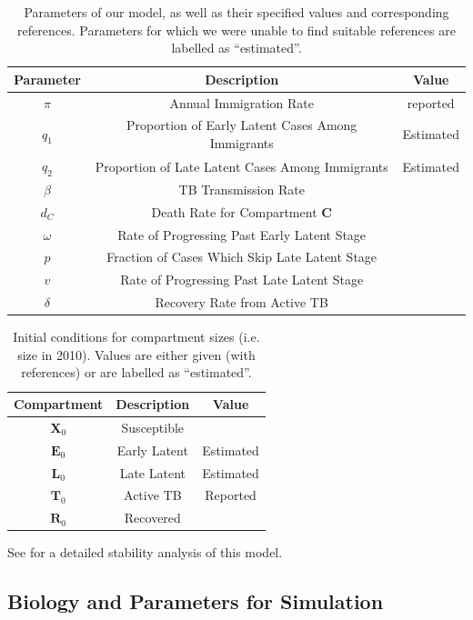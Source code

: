 \documentclass[sn-mathphys,Numbered]{sn-jnl}%
\newcommand{\cX}{\mathbf{X}}
\newcommand{\cE}{\mathbf{E}}
\newcommand{\cL}{\mathbf{L}}
\newcommand{\cT}{\mathbf{T}}
\newcommand{\cR}{\mathbf{R}}
\theoremstyle{thmstyleone}%
\theoremstyle{thmstyletwo}%
\theoremstyle{thmstylethree}%
\begin{document}
\begin{table}
    \centering
    \begin{tabular}{ccc}
        Parameter & Description & Value \\
        \hline
        $\pi$ & Annual Immigration Rate & reported \cite{https://www150.statcan.gc.ca/n1/pub/11-630-x/11-630-x2016006-eng.htm}\\
        $q_1$ & Proportion of Early Latent Cases Among Immigrants & Estimated \\
        $q_2$ & Proportion of Late Latent Cases Among Immigrants & Estimated \\
        $\beta$ & TB Transmission Rate & \\
        $d_C$ & Death Rate for Compartment $\mathbf{C}$ & \\
        $\omega$ & Rate of Progressing Past Early Latent Stage & \\
        $p$ & Fraction of Cases Which Skip Late Latent Stage &\\
        $v$ & Rate of Progressing Past Late Latent Stage &\\
        $\delta$ & Recovery Rate from Active TB&
    \end{tabular}
    \caption{Parameters of our model, as well as their specified values and corresponding references. Parameters for which we were unable to find suitable references are labelled as ``estimated''.}
    \label{tab:pars}
\end{table}

\begin{table}
    \centering
    \begin{tabular}{ccc}
    Compartment & Description & Value\\
    \hline
    $\cX_0$ & Susceptible & \\
    $\cE_0$ & Early Latent & Estimated\\
    $\cL_0$ & Late Latent & Estimated\\
    $\cT_0$ & Active TB & Reported \\
    $\cR_0$ & Recovered & 
    \end{tabular}
    \caption{Initial conditions for compartment sizes (i.e. size in 2010). Values are either given (with references) or are labelled as ``estimated''.}
    \label{tab:init}
\end{table}

See \citet{Guo2011PersistentLatency} for a detailed stability analysis of this model.


\subsection{Biology and Parameters for Simulation}
\label{sec:data_pars}
\end{document}
